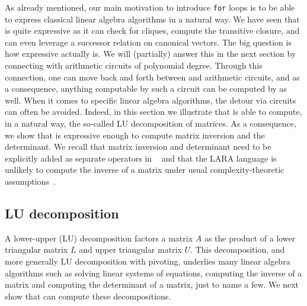As already mentioned, our main motivation to introduce \texttt{for} loops is to be able
to express classical linear algebra algorithms in a natural way. We have seen that \langfor is
quite expressive as it can check for cliques, compute the transitive closure, and can even
leverage a successor relation on canonical vectors. The big question is how expressive \langfor
actually is. We will (partially) answer this in the next section by connecting \langfor with 
arithmetic circuits of polynomial degree. Through this connection, one can move back and forth between \langfor and arithmetic circuits, and as a consequence, anything computable by such a circuit can be
computed by \langfor as well. When it comes to specific linear algebra algorithms, the detour via circuits
can often be avoided. Indeed, in this section we illustrate that \langfor is able to
compute, in a natural way, the so-called LU decomposition of matrices. As a consequence, we show that \langfor is expressive enough to compute matrix inversion and the determinant. We recall that matrix inversion and determinant need to be explicitly added as separate operators in \lang~\cite{matlang,matlang-journal} and that the LARA language is unlikely to compute the inverse of a matrix under usual complexity-theoretic assumptions~\cite{BarceloH0S20}.

\subsection{LU decomposition}
%
%
A lower-upper (LU) decomposition factors a matrix $A$ as the product of a lower triangular matrix $L$ and upper triangular matrix $U$. This decomposition, and more generally LU decomposition with pivoting,  underlies many linear algebra algorithms such as solving linear systems of equations, computing the inverse of a matrix and computing the determinant of a matrix, just to name a few. We next show that \langfor can compute these decompositions.

